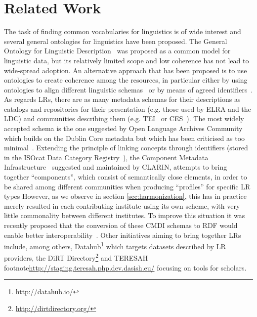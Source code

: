 \documentclass{llncs}
\begin{document}
\section{Related Work}
\label{sec:relatedwork}
The task of finding common vocabularies for linguistics is of wide interest and several general ontologies for linguistics have been proposed. The General Ontology for Linguistic Description~\cite[GOLD]{farrar2002common} was proposed as a common model for linguistic data, but its relatively limited scope and low coherence has not lead to wide-spread adoption. An alternative approach that has been proposed is to use ontologies to create coherence among the resources, in particular either by using ontologies to align different linguistic schemas~\cite{chiarcos2012ontologies} or by means of agreed identifiers~\cite{kemps2008isocat}. 
As regards LRs, there are as many metadata schemas for their descriptions as
catalogs and repositories for their presentation (e.g. those used by ELRA and
the LDC) and communities describing them (e.g. TEI~\cite{ide1995text} or
CES~\cite{ide1998corpus}). The most widely accepted schema is the one  suggested
by Open Language Archives Community~\cite[OLAC]{bird2001olac} which builds on
the Dublin Core metadata but which has been criticised as too minimal~\cite{who}. 
Extending the principle of linking concepts through identifiers (stored in the
ISOcat Data Category Registry~\cite{kemps2008isocat}), the Component Metadata Infrastructure~\cite{broeder2012cmdi} suggested and maintained by CLARIN, attempts to bring together ``components'', which consist of semantically close elements, in order to be shared among different communities when producing ``profiles'' for specific LR types
However, as  we observe in section \ref{sec:harmonization}, this has in practice
merely resulted in each contributing institute using its own scheme, with very
little commonality between different institutes. To improve this situation it
was recently proposed that the conversion of these CMDI schemas to RDF would
enable better interoperability~\cite{durco2014clarin}.
Other initiatives aiming to bring together LRs include, among others,
Datahub\footnote{\url{http://datahub.io/}} which targets datasets described by
LR providers, the DiRT Directory\footnote{\url{http://dirtdirectory.org/}} and
TERESAH footnote{\url{http://staging.teresah.php.dev.dasish.eu/}} focusing on
tools for scholars.
\end{document}
